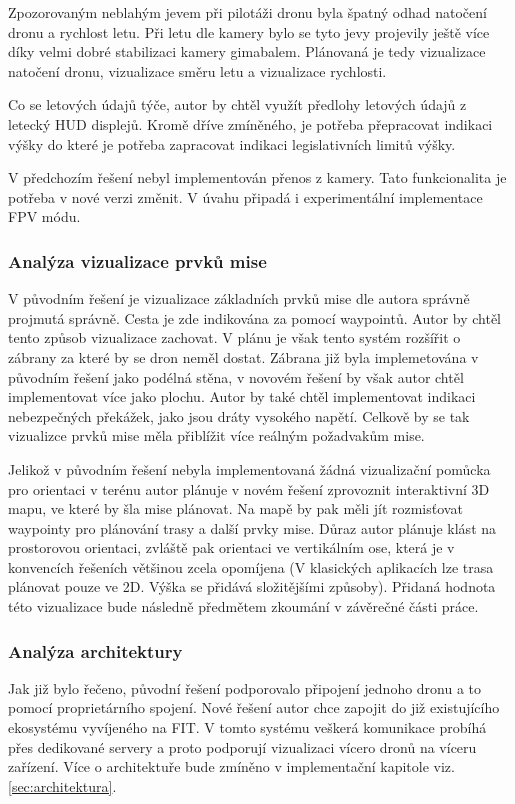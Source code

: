 Zpozorovaným neblahým jevem při pilotáži dronu byla špatný odhad natočení dronu a rychlost letu. Při letu dle kamery bylo se tyto jevy projevily ještě více díky velmi dobré stabilizaci kamery gimabalem. Plánovaná je tedy vizualizace natočení dronu, vizualizace směru letu a vizualizace rychlosti.

Co se letových údajů týče, autor by chtěl využít předlohy letových údajů z letecký HUD displejů. Kromě dříve zmíněného, je potřeba přepracovat indikaci výšky do které je potřeba zapracovat indikaci legislativních limitů výšky.

V předchozím řešení nebyl implementován přenos z kamery. Tato funkcionalita je potřeba v nové verzi změnit. V úvahu připadá i experimentální implementace FPV módu.
\subsubsection{Analýza vizualizace prvků mise}
V původním řešení je vizualizace základních prvků mise dle autora správně projmutá správně. Cesta je zde indikována za pomocí waypointů. Autor by chtěl tento způsob vizualizace zachovat. V plánu je však tento systém rozšířit o zábrany za které by se dron neměl dostat. Zábrana již byla implemetována v původním řešení jako podélná stěna, v novovém řešení by však autor chtěl implementovat více jako plochu. Autor by také chtěl implementovat indikaci nebezpečných překážek, jako jsou dráty vysokého napětí. Celkově by se tak vizualizce prvků mise měla přiblížit více reálným požadvakům mise.

Jelikož v původním řešení nebyla implementovaná žádná vizualizační pomůcka pro orientaci v terénu autor plánuje v novém řešení zprovoznit interaktivní 3D mapu, ve které by šla mise plánovat. Na mapě by pak měli jít rozmisťovat waypointy pro plánování trasy a další prvky mise. Důraz autor plánuje klást na prostorovou orientaci, zvláště pak orientaci ve vertikálním ose, která je v konvencích řešeních většinou zcela opomíjena (V klasických aplikacích lze trasa plánovat pouze ve 2D. Výška se přidává složitějšími způsoby). Přidaná hodnota této vizualizace bude následně předmětem zkoumání v závěrečné části práce.
\subsubsection{Analýza architektury}
Jak již bylo řečeno, původní řešení podporovalo připojení jednoho dronu a to pomocí proprietárního spojení. Nové řešení autor chce zapojit do již existujícího ekosystému vyvíjeného na FIT. V tomto systému veškerá komunikace probíhá přes dedikované servery a proto podporují vizualizaci vícero dronů na víceru zařízení. Více o architektuře bude zmíněno v implementační kapitole viz. \ref{sec:architektura}.
